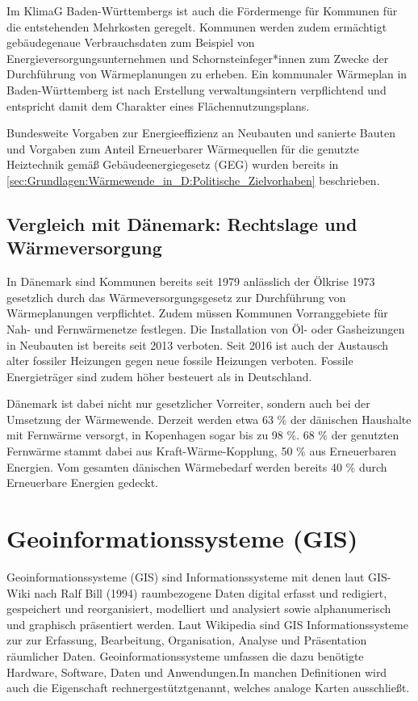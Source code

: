 			Im KlimaG Baden-Württembergs ist auch die Fördermenge für Kommunen für die entstehenden Mehrkosten geregelt. Kommunen werden zudem ermächtigt gebäudegenaue Verbrauchsdaten zum Beispiel von Energieversorgungsunternehmen und Schornsteinfeger*innen zum Zwecke der Durchführung von Wärmeplanungen zu erheben. Ein kommunaler Wärmeplan in Baden-Württemberg ist nach Erstellung verwaltungsintern verpflichtend und entspricht damit dem Charakter eines Flächennutzungsplans. \cite{web_gesetze_klimag_bw} \cite{kea_bw_leitfaden_waermeplanung}
	
			Bundesweite Vorgaben zur Energieeffizienz an Neubauten und sanierte Bauten und Vorgaben zum Anteil Erneuerbarer Wärmequellen für die genutzte Heiztechnik gemäß Gebäudeenergiegesetz (GEG) wurden bereits in \autoref{sec:Grundlagen:Wärmewende_in_D:Politische_Zielvorhaben} beschrieben.
			
		\subsection{Vergleich mit Dänemark: Rechtslage und Wärmeversorgung}
		\label{sec:Grundlagen:Rechtslage_in_Dänemark}
			In Dänemark sind Kommunen bereits seit 1979 anlässlich der Ölkrise 1973 gesetzlich durch das Wärmeversorgungsgesetz zur Durchführung von Wärmeplanungen verpflichtet. Zudem müssen Kommunen Vorranggebiete für Nah- und Fernwärmenetze festlegen. Die Installation von Öl- oder Gasheizungen in Neubauten ist bereits seit 2013 verboten. Seit 2016 ist auch der Austausch alter fossiler Heizungen gegen neue fossile Heizungen verboten. Fossile Energieträger sind zudem höher besteuert als in Deutschland. \cite{waermewende_daenemark}
			
			Dänemark ist dabei nicht nur gesetzlicher Vorreiter, sondern auch bei der Umsetzung der Wärmewende. Derzeit werden etwa 63 \% der dänischen Haushalte mit Fernwärme versorgt, in Kopenhagen sogar bis zu 98 \%. 68 \% der genutzten Fernwärme stammt dabei aus Kraft-Wärme-Kopplung, 50 \% aus Erneuerbaren Energien. Vom gesamten dänischen Wärmebedarf werden bereits 40 \% durch Erneuerbare Energien gedeckt. \cite{waermewende_daenemark} 
			
	\section{Geoinformationssysteme (GIS)}
	\label{sec:Grundlagen:GIS}
		Geoinformationssysteme (GIS) sind Informationssysteme mit denen laut GIS-Wiki nach Ralf Bill (1994) \frqq raumbezogene Daten digital erfasst und redigiert, gespeichert und reorganisiert, modelliert und analysiert sowie alphanumerisch und graphisch präsentiert werden. \flqq Laut Wikipedia sind GIS Informationssysteme zur \frqq zur Erfassung, Bearbeitung, Organisation, Analyse und Präsentation räumlicher Daten. Geoinformationssysteme umfassen die dazu benötigte Hardware, Software, Daten und Anwendungen.\flqq In manchen Definitionen wird auch die Eigenschaft \frqq rechnergestützt\flqq genannt, welches analoge Karten ausschließt. \cite{web_giswiki_gis}\cite{web_wikipedia_gis}
	
